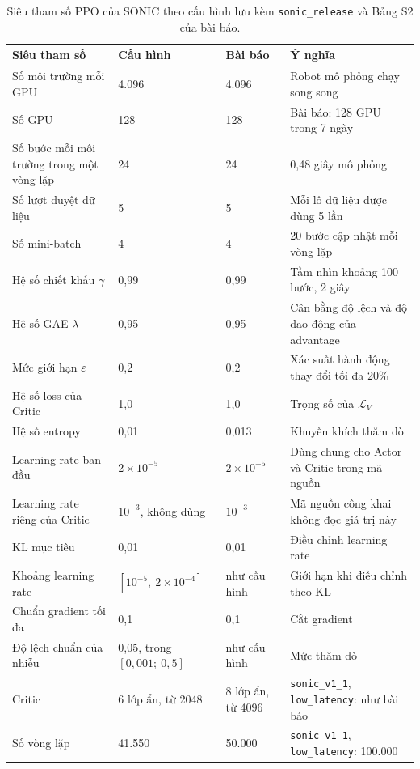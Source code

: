 \documentclass[12pt,a4paper,oneside]{report}
\newcommand{\code}[1]{\texttt{#1}}
\begin{document}
\begin{table}[htbp]
\centering\footnotesize
\caption[Siêu tham số PPO của SONIC]{Siêu tham số PPO của SONIC theo cấu hình lưu kèm \code{sonic\_release} và Bảng S2 của bài báo.}
\label{tab:ppo_hparams}
\begin{tabular}{L{4.2cm}L{2.4cm}L{2.1cm}L{5.4cm}}
\toprule
\textbf{Siêu tham số} & \textbf{Cấu hình} & \textbf{Bài báo} & \textbf{Ý nghĩa}\\
\midrule
Số môi trường mỗi GPU & 4.096 & 4.096 & Robot mô phỏng chạy song song\\
Số GPU & 128 & 128 & Bài báo: 128 GPU trong 7 ngày\\
Số bước mỗi môi trường trong một vòng lặp & 24 & 24 & 0,48 giây mô phỏng\\
Số lượt duyệt dữ liệu & 5 & 5 & Mỗi lô dữ liệu được dùng 5 lần\\
Số mini-batch & 4 & 4 & 20 bước cập nhật mỗi vòng lặp\\
Hệ số chiết khấu $\gamma$ & 0,99 & 0,99 & Tầm nhìn khoảng 100 bước, 2 giây\\
Hệ số GAE $\lambda$ & 0,95 & 0,95 & Cân bằng độ lệch và độ dao động của advantage\\
Mức giới hạn $\varepsilon$ & 0,2 & 0,2 & Xác suất hành động thay đổi tối đa 20\%\\
Hệ số loss của Critic & 1,0 & 1,0 & Trọng số của $\mathcal{L}_V$\\
Hệ số entropy & 0,01 & 0,013 & Khuyến khích thăm dò\\
Learning rate ban đầu & $2 \times 10^{-5}$ & $2 \times 10^{-5}$ & Dùng chung cho Actor và Critic trong mã nguồn\\
Learning rate riêng của Critic & $10^{-3}$, không dùng & $10^{-3}$ & Mã nguồn công khai không đọc giá trị này\\
KL mục tiêu & 0,01 & 0,01 & Điều chỉnh learning rate\\
Khoảng learning rate & $[10^{-5},\ 2 \times 10^{-4}]$ & như cấu hình & Giới hạn khi điều chỉnh theo KL\\
Chuẩn gradient tối đa & 0,1 & 0,1 & Cắt gradient\\
Độ lệch chuẩn của nhiễu & 0,05, trong $[0{,}001;\ 0{,}5]$ & như cấu hình & Mức thăm dò\\
Critic & 6 lớp ẩn, từ 2048 & 8 lớp ẩn, từ 4096 & \code{sonic\_v1\_1}, \code{low\_latency}: như bài báo\\
Số vòng lặp & 41.550 & 50.000 & \code{sonic\_v1\_1}, \code{low\_latency}: 100.000\\
\bottomrule
\end{tabular}
\end{table}
\end{document}

